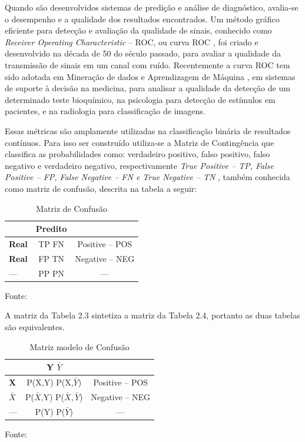 Quando são desenvolvidos sistemas de predição e análise de diagnóstico, avalia-se o desempenho e a qualidade dos resultados encontrados.
Um método gráfico eficiente para detecção e avaliação da qualidade de sinais, conhecido como \textit{Receiver Operating Characteristic} -- ROC, ou curva ROC \cite{ROC},
foi criado e desenvolvido na década de 50 do século passado, para avaliar a qualidade da transmissão de sinais em um canal com ruído.
Recentemente a curva ROC tem sido adotada em Mineração de dados e Aprendizagem de Máquina \cite{MD_AM}, em sistemas de suporte à decisão na medicina, para analisar a qualidade da detecção 
de um determinado teste bioquímico, na psicologia para detecção de estímulos \cite{Discriminativo} em pacientes, e na radiologia para classificação de imagens.

Essas métricas são amplamente utilizadas na classificação binária de resultados contínuos. Para isso ser construído utiliza-se a Matriz de Contingência que classifica as probabilidades como:
verdadeiro positivo, falso positivo, falso negativo e verdadeiro negativo, respectivamente \textit{True Positive -- TP, False Positive -- FP, False Negative -- FN e True Negative -- TN },
também conhecida como matriz de confusão, descrita na tabela a seguir:

\begin{table}[ht]
\centering
\caption{Matriz de Confusão}
\vspace{1mm}
\begin{tabular}{l|c|c}
\hline
\textbf{} & \textbf{Predito} & \textbf{}\\
\hline
\textbf{Real}  & TP   FN & Positive -- POS\\
\textbf{Real}  & FP   TN & Negative -- NEG\\
\hline
   ---         & PP   PN &    ---         \\
\end{tabular}
\tiny Fonte: \cite{Bradley1997}
\end{table}

A matriz da Tabela 2.3 sintetiza a matriz da Tabela 2.4, portanto as duas tabelas são equivalentes.

\begin{table}[ht]
\centering
\caption{Matriz modelo de Confusão}
\vspace{1mm}
\begin{tabular}{l|c|c}
\hline
\textbf{}           & \textbf{Y}     \textbf{$\bar{Y}$}   & \textbf{}\\
\hline
\textbf{X}          & P(X,Y)         P(X,$\bar{Y}$)       & Positive -- POS\\
\textbf{$\bar{X}$}  & P($\bar{X}$,Y) P($\bar{X},\bar{Y}$) & Negative -- NEG\\
\hline
   ---              & P(Y)           P($\bar{Y}$)         &     ---        \\
\end{tabular}
\tiny Fonte: \cite{Bradley1997}
\end{table}


